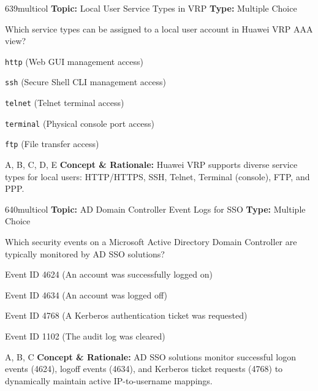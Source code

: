 \begin{qcard}{639}{multicol}
\textcolor{darkslate!75}{\small\textbf{Topic:} Local User Service Types in VRP \hfill \textbf{Type:} Multiple Choice}\vspace{0.4em}\par
Which service types can be assigned to a local user account in Huawei VRP AAA view?
\begin{qoptions}
\item \texttt{http} (Web GUI management access)
\item \texttt{ssh} (Secure Shell CLI management access)
\item \texttt{telnet} (Telnet terminal access)
\item \texttt{terminal} (Physical console port access)
\item \texttt{ftp} (File transfer access)
\end{qoptions}
\end{qcard}
\nopagebreak
\begin{explainbox}{A, B, C, D, E}
\textbf{Concept \& Rationale:} Huawei VRP supports diverse service types for local users: HTTP/HTTPS, SSH, Telnet, Terminal (console), FTP, and PPP.
\end{explainbox}

\begin{qcard}{640}{multicol}
\textcolor{darkslate!75}{\small\textbf{Topic:} AD Domain Controller Event Logs for SSO \hfill \textbf{Type:} Multiple Choice}\vspace{0.4em}\par
Which security events on a Microsoft Active Directory Domain Controller are typically monitored by AD SSO solutions?
\begin{qoptions}
\item Event ID 4624 (An account was successfully logged on)
\item Event ID 4634 (An account was logged off)
\item Event ID 4768 (A Kerberos authentication ticket was requested)
\item Event ID 1102 (The audit log was cleared)
\end{qoptions}
\end{qcard}
\nopagebreak
\begin{explainbox}{A, B, C}
\textbf{Concept \& Rationale:} AD SSO solutions monitor successful logon events (4624), logoff events (4634), and Kerberos ticket requests (4768) to dynamically maintain active IP-to-username mappings.
\end{explainbox}

